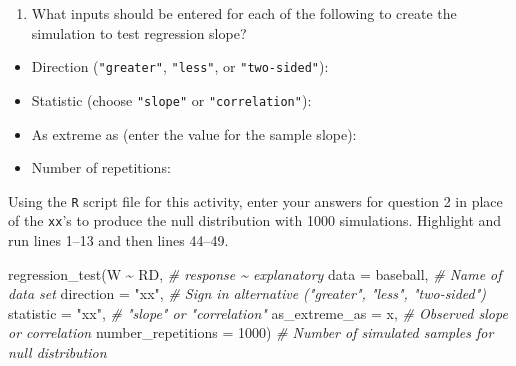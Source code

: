 \documentclass[
]{report}
\newenvironment{Shaded}{\begin{snugshade}}{\end{snugshade}}
\newcommand{\AttributeTok}[1]{\textcolor[rgb]{0.77,0.63,0.00}{#1}}
\newcommand{\CommentTok}[1]{\textcolor[rgb]{0.56,0.35,0.01}{\textit{#1}}}
\newcommand{\DecValTok}[1]{\textcolor[rgb]{0.00,0.00,0.81}{#1}}
\newcommand{\FunctionTok}[1]{\textcolor[rgb]{0.00,0.00,0.00}{#1}}
\newcommand{\NormalTok}[1]{#1}
\newcommand{\SpecialCharTok}[1]{\textcolor[rgb]{0.00,0.00,0.00}{#1}}
\newcommand{\StringTok}[1]{\textcolor[rgb]{0.31,0.60,0.02}{#1}}
\providecommand{\tightlist}{%
  \setlength{\itemsep}{0pt}\setlength{\parskip}{0pt}}
\begin{document}
\begin{enumerate}
\def\labelenumi{\arabic{enumi}.}
\setcounter{enumi}{1}
\tightlist
\item
  What inputs should be entered for each of the following to create the simulation to test regression slope?
\end{enumerate}

\vspace{.5 mm}

\begin{itemize}
\tightlist
\item
  Direction (\texttt{"greater"}, \texttt{"less"}, or \texttt{"two-sided"}):
\end{itemize}

\vspace{.2in}

\begin{itemize}
\tightlist
\item
  Statistic (choose \texttt{"slope"} or \texttt{"correlation"}):
\end{itemize}

\vspace{.2in}

\begin{itemize}
\tightlist
\item
  As extreme as (enter the value for the sample slope):
\end{itemize}

\vspace{0.2in}

\begin{itemize}
\tightlist
\item
  Number of repetitions:
\end{itemize}

\vspace{.2in}

Using the \texttt{R} script file for this activity, enter your answers for question 2 in place of the \texttt{xx}'s to produce the null distribution with 1000 simulations. Highlight and run lines 1--13 and then lines 44--49.

\begin{Shaded}
\begin{Highlighting}[]
\FunctionTok{regression\_test}\NormalTok{(W }\SpecialCharTok{\textasciitilde{}}\NormalTok{ RD, }\CommentTok{\# response \textasciitilde{} explanatory}
               \AttributeTok{data =}\NormalTok{ baseball, }\CommentTok{\# Name of data set}
               \AttributeTok{direction =} \StringTok{"xx"}\NormalTok{, }\CommentTok{\# Sign in alternative ("greater", "less", "two{-}sided")}
               \AttributeTok{statistic =} \StringTok{"xx"}\NormalTok{, }\CommentTok{\# "slope" or "correlation"}
               \AttributeTok{as\_extreme\_as =}\NormalTok{ x, }\CommentTok{\# Observed slope or correlation}
               \AttributeTok{number\_repetitions =} \DecValTok{1000}\NormalTok{) }\CommentTok{\# Number of simulated samples for null distribution}
       
\end{Highlighting}
\end{Shaded}
\end{document}
